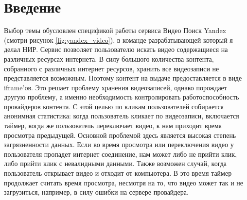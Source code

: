 




\chapter{Введение}

Выбор темы обусловлен спецификой работы сервиса Видео Поиск Yandex (смотри рисунок \ref{fig:yandex_video}), в команде разрабатывающей который я делал НИР. Сервис позволяет пользователю искать видео содержащиеся на различных ресурсах интернета. В силу большого количества контента, собранного с различных интернет ресурсов, хранить все видеозаписи не представляется возможным. Поэтому контент на выдаче предоставляется в виде iframe'ов. Это решает проблему хранения видеозаписей, однако порождает другую проблему, а именно необходимость контролировать работоспособность провайдеров контента. С этой целью по кликам пользователей собирается анонимная статистика: когда пользователь кликает по видеозаписи, включается таймер, когда же пользователь переключает видео, к нам приходит время просмотра предыдущей. Основной проблемой здесь является высокая степень загрязненности данных. Если во время просмотра или переключения видео у пользователя пропадет интернет соединение, нам может либо не прийти клик, либо прийти клик с невалидными данными. Также возможен случай, когда пользователь открывает видео и отходит от компьютера. В это время таймер продолжает считать время просмотра, несмотря на то, что видео может так и не загрузиться, например, в силу ошибки на сервере провайдера.

